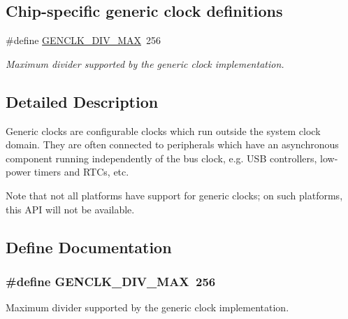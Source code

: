 \subsection*{\-Chip-\/specific generic clock definitions}
\begin{DoxyCompactItemize}
\item 
\#define \hyperlink{group__genclk__group_gada51baf0de37e57d7052f6f6ea324b53}{\-G\-E\-N\-C\-L\-K\-\_\-\-D\-I\-V\-\_\-\-M\-A\-X}~256
\begin{DoxyCompactList}\small\item\em \-Maximum divider supported by the generic clock implementation. \end{DoxyCompactList}\end{DoxyCompactItemize}


\subsection{\-Detailed \-Description}
\-Generic clocks are configurable clocks which run outside the system clock domain. \-They are often connected to peripherals which have an asynchronous component running independently of the bus clock, e.\-g. \-U\-S\-B controllers, low-\/power timers and \-R\-T\-Cs, etc.

\-Note that not all platforms have support for generic clocks; on such platforms, this \-A\-P\-I will not be available. 

\subsection{\-Define \-Documentation}
\hypertarget{group__genclk__group_gada51baf0de37e57d7052f6f6ea324b53}{
\subsubsection[{\-G\-E\-N\-C\-L\-K\-\_\-\-D\-I\-V\-\_\-\-M\-A\-X}]{\setlength{\rightskip}{0pt plus 5cm}\#define \-G\-E\-N\-C\-L\-K\-\_\-\-D\-I\-V\-\_\-\-M\-A\-X~256}}
\label{group__genclk__group_gada51baf0de37e57d7052f6f6ea324b53}


\-Maximum divider supported by the generic clock implementation. 



